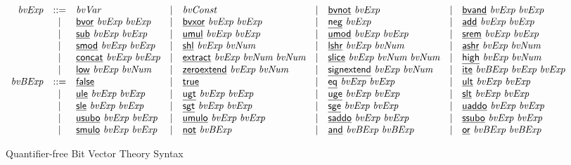 


\begin{figure*}
  \centering
  \begin{math}
    \begin{array}{rclclclcl}
      \bvExp & ::= &
        \bvVar
      & | & \bvConst
      & | & \bvNot\ \bvExp
      & | & \bvAnd\ \bvExp\ \bvExp
      \\
      & | & \bvOr\ \bvExp\ \bvExp
      & | & \bvXor\ \bvExp\ \bvExp
      & | & \bvNeg\ \bvExp
      & | & \bvAdd\ \bvExp\ \bvExp
      \\
      & | & \bvSub\ \bvExp\ \bvExp
      & | & \bvMul\ \bvExp\ \bvExp
      & | & \bvMod\ \bvExp\ \bvExp
      & | & \bvSrem\ \bvExp\ \bvExp
      \\
      & | & \bvSmod\ \bvExp\ \bvExp
      & | & \bvShl\ \bvExp\ \bvNum
      & | & \bvLshr\ \bvExp\ \bvNum
      & | & \bvAshr\ \bvExp\ \bvNum
      \\
      & | & \bvConcat\ \bvExp\ \bvExp
      & | & \bvExtract\ \bvExp\ \bvNum\ \bvNum
      & | & \bvSlice\ \bvExp\ \bvNum\ \bvNum
      & | & \bvHigh\ \bvExp\ \bvNum
      \\
      & | & \bvLow\ \bvExp\ \bvNum
      & | & \bvZeroExtend\ \bvExp\ \bvNum
      & | & \bvSignExtend\ \bvExp\ \bvNum
      & | & \bvIte\ \bvBExp\ \bvExp\ \bvExp
      \\
      \bvBExp & ::= &
        \bvFalse
      & | & \bvTrue
      & | & \bvEq\ \bvExp\ \bvExp
      & | & \bvUlt\ \bvExp\ \bvExp
      \\
      & | & \bvUle\ \bvExp\ \bvExp
      & | & \bvUgt\ \bvExp\ \bvExp
      & | & \bvUge\ \bvExp\ \bvExp
      & | & \bvSlt\ \bvExp\ \bvExp
      \\
      & | & \bvSle\ \bvExp\ \bvExp
      & | & \bvSgt\ \bvExp\ \bvExp
      & | & \bvSge\ \bvExp\ \bvExp
      & | & \bvUaddo\ \bvExp\ \bvExp
      \\
      & | & \bvUsubo\ \bvExp\ \bvExp
      & | & \bvUmulo\ \bvExp\ \bvExp
      & | & \bvSaddo\ \bvExp\ \bvExp
      & | & \bvSsubo\ \bvExp\ \bvExp
      \\
      & | & \bvSmulo\ \bvExp\ \bvExp
      & | & \bvLneg\ \bvBExp
      & | & \bvConj\ \bvBExp\ \bvBExp
      & | & \bvDisj\ \bvBExp\ \bvBExp
    \end{array}
  \end{math}
  \caption{Quantifier-free Bit Vector Theory Syntax}
  \label{figure:qfbv-syntax}
\end{figure*}


